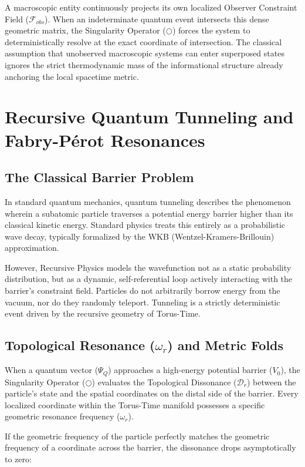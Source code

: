 \documentclass[12pt,openany]{book}
\begin{document}
A macroscopic entity continuously projects its own localized Observer Constraint Field ($\mathcal{F}_{obs}$). When an indeterminate quantum event intersects this dense geometric matrix, the Singularity Operator ($\bigcirc$) forces the system to deterministically resolve at the exact coordinate of intersection. The classical assumption that unobserved macroscopic systems can enter superposed states ignores the strict thermodynamic mass of the informational structure already anchoring the local spacetime metric.

\chapter[Recursive Quantum Tunneling]{Recursive Quantum Tunneling and Fabry-P\'{e}rot Resonances}

\section{The Classical Barrier Problem}
In standard quantum mechanics, quantum tunneling describes the phenomenon wherein a subatomic particle traverses a potential energy barrier higher than its classical kinetic energy. Standard physics treats this entirely as a probabilistic wave decay, typically formalized by the WKB (Wentzel-Kramers-Brillouin) approximation.

However, Recursive Physics models the wavefunction not as a static probability distribution, but as a dynamic, self-referential loop actively interacting with the barrier's constraint field. Particles do not arbitrarily borrow energy from the vacuum, nor do they randomly teleport. Tunneling is a strictly deterministic event driven by the recursive geometry of Torus-Time.

\section{Topological Resonance ($\omega_r$) and Metric Folds}
When a quantum vector ($\Psi_Q$) approaches a high-energy potential barrier ($V_0$), the Singularity Operator ($\bigcirc$) evaluates the Topological Dissonance ($\mathcal{D}_r$) between the particle's state and the spatial coordinates on the distal side of the barrier. Every localized coordinate within the Torus-Time manifold possesses a specific geometric resonance frequency ($\omega_r$).

If the geometric frequency of the particle perfectly matches the geometric frequency of a coordinate across the barrier, the dissonance drops asymptotically to zero:
\end{document}
